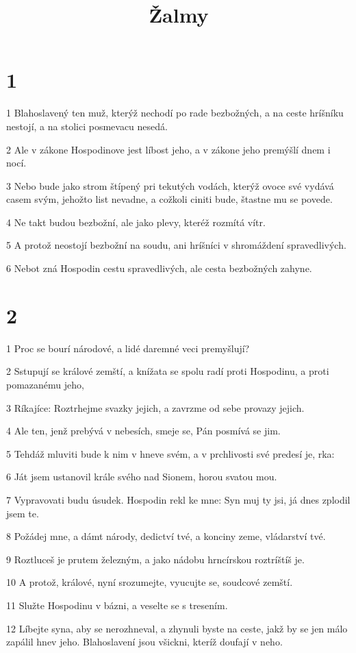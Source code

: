 

\title{Žalmy}

\chapter{1}

\par 1 Blahoslavený ten muž, kterýž nechodí po rade bezbožných, a na ceste hríšníku nestojí, a na stolici posmevacu nesedá.
\par 2 Ale v zákone Hospodinove jest líbost jeho, a v zákone jeho premýšlí dnem i nocí.
\par 3 Nebo bude jako strom štípený pri tekutých vodách, kterýž ovoce své vydává casem svým, jehožto list nevadne, a cožkoli ciniti bude, štastne mu se povede.
\par 4 Ne takt budou bezbožní, ale jako plevy, kteréž rozmítá vítr.
\par 5 A protož neostojí bezbožní na soudu, ani hríšníci v shromáždení spravedlivých.
\par 6 Nebot zná Hospodin cestu spravedlivých, ale cesta bezbožných zahyne.

\chapter{2}

\par 1 Proc se bourí národové, a lidé daremné veci premyšlují?
\par 2 Sstupují se králové zemští, a knížata se spolu radí proti Hospodinu, a proti pomazanému jeho,
\par 3 Ríkajíce: Roztrhejme svazky jejich, a zavrzme od sebe provazy jejich.
\par 4 Ale ten, jenž prebývá v nebesích, smeje se, Pán posmívá se jim.
\par 5 Tehdáž mluviti bude k nim v hneve svém, a v prchlivosti své predesí je, rka:
\par 6 Ját jsem ustanovil krále svého nad Sionem, horou svatou mou.
\par 7 Vypravovati budu úsudek. Hospodin rekl ke mne: Syn muj ty jsi, já dnes zplodil jsem te.
\par 8 Požádej mne, a dámt národy, dedictví tvé, a konciny zeme, vládarství tvé.
\par 9 Roztluceš je prutem železným, a jako nádobu hrncírskou roztríštíš je.
\par 10 A protož, králové, nyní srozumejte, vyucujte se, soudcové zemští.
\par 11 Služte Hospodinu v bázni, a veselte se s tresením.
\par 12 Líbejte syna, aby se nerozhneval, a zhynuli byste na ceste, jakž by se jen málo zapálil hnev jeho. Blahoslavení jsou všickni, kteríž doufají v neho.


